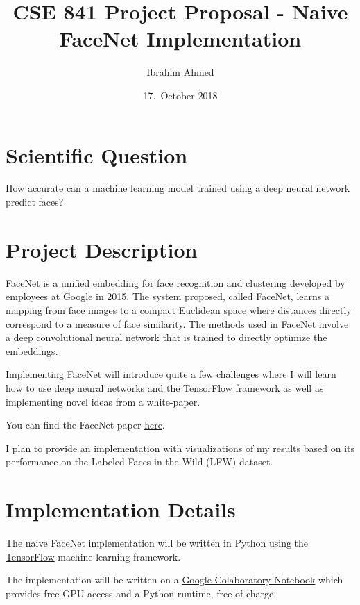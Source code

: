 \documentclass{article}
\begin{document}
\date{17.~October 2018}

\title{CSE 841 Project Proposal - Naive FaceNet Implementation}
\author{Ibrahim Ahmed}

\maketitle

\section{Scientific Question}

How accurate can a machine learning model trained using a deep neural network predict faces?

\section{Project Description}

FaceNet is a unified embedding for face recognition and clustering developed by employees at Google in 2015. The system proposed, called FaceNet, learns a mapping from face images to a compact Euclidean space where distances directly correspond to a measure of face similarity. The methods used in FaceNet involve a deep convolutional neural network that is trained to directly optimize the embeddings.

Implementing FaceNet will introduce quite a few challenges where I will learn how to use deep neural networks and the TensorFlow framework as well as implementing novel ideas from a white-paper.

You can find the FaceNet paper \href{https://arxiv.org/abs/1503.03832}{here}.

I plan to provide an implementation with visualizations of my results based on its performance on the Labeled Faces in the Wild (LFW) dataset.

\section{Implementation Details}

The naive FaceNet implementation will be written in Python using the \href{https://www.tensorflow.org/}{TensorFlow} machine learning framework.

The implementation will be written on a \href{https://colab.research.google.com}{Google Colaboratory Notebook} which provides free GPU access and a Python runtime, free of charge.
\end{document}

